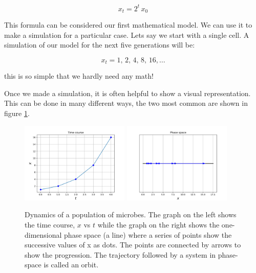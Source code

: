 \documentclass{tufte-book} %
\begin{document}
\begin{equation}
	x_{t} = 2^t \, x_0
\end{equation}

This formula can be considered our first mathematical model. We can use it to make a simulation for a particular case. Lets say we start with a single cell. A simulation of our model for the next five generations will be:

\begin{equation}
	x_{t} =1 ,\, 2 ,\,4 ,\,8 ,\,16,\dots
\end{equation}

this is so simple that we hardly need any math!

Once we made a simulation, it is often helpful to show a visual representation. This can be done in many different ways, the two most common are shown in figure \ref{fig:tcourse}. 


\begin{figure}
	\begin{center}
		\includegraphics[width=0.46\textwidth]{time_course}
		\includegraphics[width=0.46\textwidth]{phase_space}
	\end{center}
	\caption{Dynamics of a population of microbes. The graph on the left shows the time course, $x$ vs $t$ while the graph on the right shows the one-dimensional phase space (a line) where a series of points show the successive values of x as dots. The points are connected by arrows to show the progression. The trajectory followed by a system in phase-space is called an orbit.}
	\label{fig:tcourse}
\end{figure}
\end{document}
